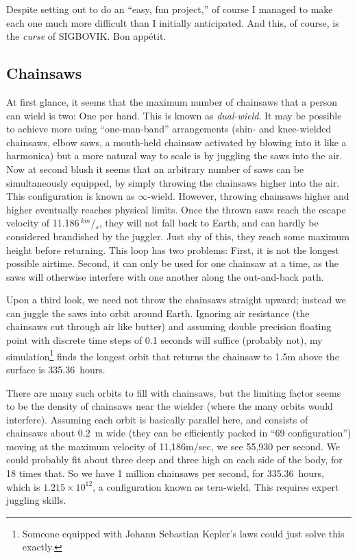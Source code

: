 \documentclass[twocolumn]{article}
\newcommand\sfrac[2]{\!{}\,^{#1}\!/{}\!_{#2}}
\begin{document}
Despite setting out to do an ``easy, fun project,'' of course I
managed to make each one much more difficult than I initially
anticipated. And this, of course, is the {\em curse} of SIGBOVIK.
Bon app\'etit.

\subsection{Chainsaws}

At first glance, it seems that the maximum number of chainsaws that a
person can wield is two: One per hand. This is known as {\em
  dual-wield}. It may be possible to achieve more using
``one-man-band'' arrangements (shin- and knee-wielded chainsaws, elbow
saws, a mouth-held chainsaw activated by blowing into it like a
harmonica) but a more natural way to scale is by juggling the saws
into the air. Now at second blush it seems that an arbitrary number of
saws can be simultaneously equipped, by simply throwing the chainsaws
higher into the air. This configuration is known as $\infty$-wield.
However, throwing chainsaws higher and higher eventually reaches
physical limits. Once the thrown saws reach the escape velocity of
11.186$\sfrac{km}{s}$, they will not fall back to Earth, and can
hardly be considered brandished by the juggler. Just shy of this, they
reach some maximum height before returning. This loop has two
problems: First, it is not the longest possible airtime. Second, it
can only be used for one chainsaw at a time, as the saws will
otherwise interfere with one another along the out-and-back path.

Upon a third look, we need not throw the chainsaws straight upward;
instead we can juggle the saws into orbit around Earth. Ignoring air
resistance (the chainsaws cut through air like butter) and assuming
double precision floating point with discrete time steps of 0.1
seconds will suffice (probably not), my simulation\footnote{ Someone
  equipped with Johann Sebastian Kepler's laws could just solve this
  exactly.} finds the longest orbit that returns the chainsaw to 1.5m
above the surface is 335.36~hours.

There are many such orbits to fill with chainsaws, but the limiting
factor seems to be the density of chainsaws near the wielder (where
the many orbits would interfere). Assuming each orbit is basically
parallel here, and consists of chainsaws about 0.2~m wide (they can be
efficiently packed in ``69 configuration'') moving at the maximum
velocity of 11,186m/sec, we see 55,930 per second. We could probably
fit about three deep and three high on each side of the body, for 18
times that. So we have 1 million chainsaws per second, for
335.36~hours, which is $1.215 \times 10^{12}$, a configuration known
as tera-wield. This requires expert juggling skills.
\end{document}
